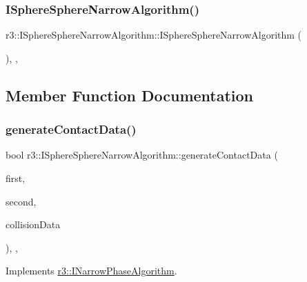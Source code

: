 \subsubsection{\texorpdfstring{I\+Sphere\+Sphere\+Narrow\+Algorithm()}{ISphereSphereNarrowAlgorithm()}}
{\footnotesize\ttfamily r3\+::\+I\+Sphere\+Sphere\+Narrow\+Algorithm\+::\+I\+Sphere\+Sphere\+Narrow\+Algorithm (\begin{DoxyParamCaption}{ }\end{DoxyParamCaption})\hspace{0.3cm}{\ttfamily [explicit]}, {\ttfamily [protected]}, {\ttfamily [default]}}



\subsection{Member Function Documentation}
\mbox{\label{classr3_1_1_i_sphere_sphere_narrow_algorithm_acfdb8ae3db8c91843216651768cbd4e2}} 
\subsubsection{\texorpdfstring{generate\+Contact\+Data()}{generateContactData()}}
{\footnotesize\ttfamily bool r3\+::\+I\+Sphere\+Sphere\+Narrow\+Algorithm\+::generate\+Contact\+Data (\begin{DoxyParamCaption}\item[{\mbox{\hyperlink{classr3_1_1_rigid_body}{Rigid\+Body}} $\ast$}]{first,  }\item[{\mbox{\hyperlink{classr3_1_1_rigid_body}{Rigid\+Body}} $\ast$}]{second,  }\item[{\mbox{\hyperlink{classr3_1_1_collision_data}{Collision\+Data}} \&}]{collision\+Data }\end{DoxyParamCaption})\hspace{0.3cm}{\ttfamily [final]}, {\ttfamily [override]}, {\ttfamily [virtual]}}



Implements \mbox{\hyperlink{classr3_1_1_i_narrow_phase_algorithm_a606fe8de5fe81ff45fedb81ca74717c3}{r3\+::\+I\+Narrow\+Phase\+Algorithm}}.


